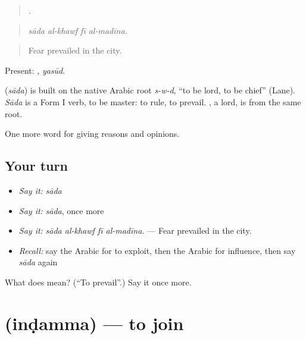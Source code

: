 \begin{quote}
   .
\end{quote}

\begin{quote}
\emph{sāda al-khawf fī al-madīna.}
\end{quote}

\begin{quote}
Fear prevailed in the city.
\end{quote}

Present: , \emph{yasūd}.

\begin{cousinweb}
\textbf{} (\emph{sāda}) is built on the native Arabic root \emph{s-w-d}, \textquotedblleft{}to be lord, to be chief\textquotedblright{} (Lane). \emph{Sāda} is a Form I verb, to be master: to rule, to prevail. , a lord, is from the same root.
\end{cousinweb}

\begin{grammarlens}[title={What you've built}]
One more word for giving reasons and opinions.
\end{grammarlens}

\subsection*{Your turn}
\begin{itemize}
\raggedright
  \item \emph{Say it:} \emph{sāda}
  \item \emph{Say it:} \emph{sāda}, once more
  \item \emph{Say it:} \emph{sāda al-khawf fī al-madīna.} — Fear prevailed in the city.
  \item \emph{Recall:} say the Arabic for to exploit, then the Arabic for influence, then say \emph{sāda} again
\end{itemize}

\begin{tcolorbox}[breakable,colback=teal!4,colframe=teal!35!black,title={Before you move on}]
What does  mean? (\textquotedblleft{}To prevail\textquotedblright{}.) Say it once more.
\end{tcolorbox}
\section[\texorpdfstring{\ar{انضم} (inḍamma)}{انضم (inḍamma)}]{ (inḍamma) — to join}

